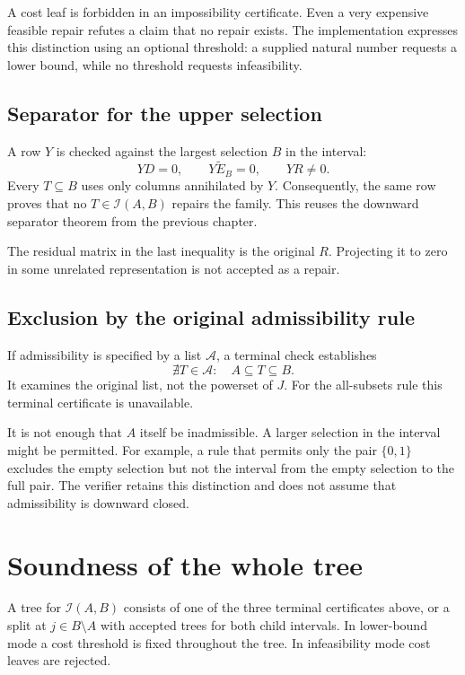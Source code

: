 A cost leaf is forbidden in an impossibility certificate. Even a very expensive feasible repair refutes a claim that no repair exists. The implementation expresses this distinction using an optional threshold: a supplied natural number requests a lower bound, while no threshold requests infeasibility.

\subsection{Separator for the upper selection}

A row $Y$ is checked against the largest selection $B$ in the interval:
\[
 YD=0,\qquad Y\widetilde E_B=0,\qquad YR\ne0.
\]
Every $T\subseteq B$ uses only columns annihilated by $Y$. Consequently, the same row proves that no $T\in\mathcal I(A,B)$ repairs the family. This reuses the downward separator theorem from the previous chapter.

The residual matrix in the last inequality is the original $R$. Projecting it to zero in some unrelated representation is not accepted as a repair.

\subsection{Exclusion by the original admissibility rule}

If admissibility is specified by a list $\mathcal A$, a terminal check establishes
\[
 \nexists T\in\mathcal A:\quad A\subseteq T\subseteq B.
\]
It examines the original list, not the powerset of $J$. For the all-subsets rule this terminal certificate is unavailable.

It is not enough that $A$ itself be inadmissible. A larger selection in the interval might be permitted. For example, a rule that permits only the pair $\{0,1\}$ excludes the empty selection but not the interval from the empty selection to the full pair. The verifier retains this distinction and does not assume that admissibility is downward closed.

\section{Soundness of the whole tree}

\begin{definition}
A tree for $\mathcal I(A,B)$ consists of one of the three terminal certificates above, or a split at $j\in B\setminus A$ with accepted trees for both child intervals. In lower-bound mode a cost threshold is fixed throughout the tree. In infeasibility mode cost leaves are rejected.
\end{definition}

